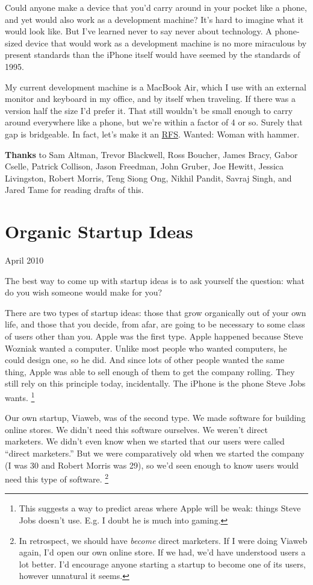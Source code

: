 \documentclass[12pt]{book}
\begin{document}
Could anyone make a device that you'd carry around in your pocket like a
phone, and yet would also work as a development machine? It's hard to
imagine what it would look like. But I've learned never to say never
about technology. A phone-sized device that would work as a development
machine is no more miraculous by present standards than the iPhone
itself would have seemed by the standards of 1995.

My current development machine is a MacBook Air, which I use with an
external monitor and keyboard in my office, and by itself when
traveling. If there was a version half the size I'd prefer it. That
still wouldn't be small enough to carry around everywhere like a phone,
but we're within a factor of 4 or so. Surely that gap is bridgeable. In
fact, let's make it an \href{http://ycombinator.com/rfs5.html}{RFS}.
Wanted: Woman with hammer.


\textbf{Thanks} to Sam Altman, Trevor Blackwell, Ross Boucher, James
Bracy, Gabor Cselle, Patrick Collison, Jason Freedman, John Gruber, Joe
Hewitt, Jessica Livingston, Robert Morris, Teng Siong Ong, Nikhil
Pandit, Savraj Singh, and Jared Tame for reading drafts of this.
\chapter{Organic Startup Ideas}

April 2010

The best way to come up with startup ideas is to ask yourself the
question: what do you wish someone would make for you?

There are two types of startup ideas: those that grow organically out of
your own life, and those that you decide, from afar, are going to be
necessary to some class of users other than you. Apple was the first
type. Apple happened because Steve Wozniak wanted a computer. Unlike
most people who wanted computers, he could design one, so he did. And
since lots of other people wanted the same thing, Apple was able to sell
enough of them to get the company rolling. They still rely on this
principle today, incidentally. The iPhone is the phone Steve Jobs wants.
\footnote{This suggests a way to predict areas where Apple will be weak:
things Steve Jobs doesn't use. E.g. I doubt he is much into gaming.}

Our own startup, Viaweb, was of the second type. We made software for
building online stores. We didn't need this software ourselves. We
weren't direct marketers. We didn't even know when we started that our
users were called ``direct marketers.'' But we were comparatively old
when we started the company (I was 30 and Robert Morris was 29), so we'd
seen enough to know users would need this type of software.
\footnote{In retrospect, we should have \emph{become} direct marketers. If
I were doing Viaweb again, I'd open our own online store. If we had,
we'd have understood users a lot better. I'd encourage anyone starting a
startup to become one of its users, however unnatural it seems.}
\end{document}
